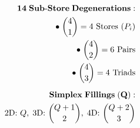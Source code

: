 \documentclass[preview]{standalone}
\begin{document}
\begin{align*}
\special{dvisvgm:raw <g id='unique000'>}\mathbf{14\;Sub\text{-}Store\;Degenerations:}\\\bullet\;\binom{4}{1}=4\text{ Stores }(P_i)\\\bullet\;\binom{4}{2}=6\text{ Pairs}\\\bullet\;\binom{4}{3}=4\text{ Triads}\\[5pt]\mathbf{Simplex\;Fillings\;(Q):}\\\text{2D: }Q,\;\text{3D: }\binom{Q+1}{2},\;\text{4D: }\binom{Q+2}{3}\special{dvisvgm:raw </g>}
\end{align*}
\end{document}

